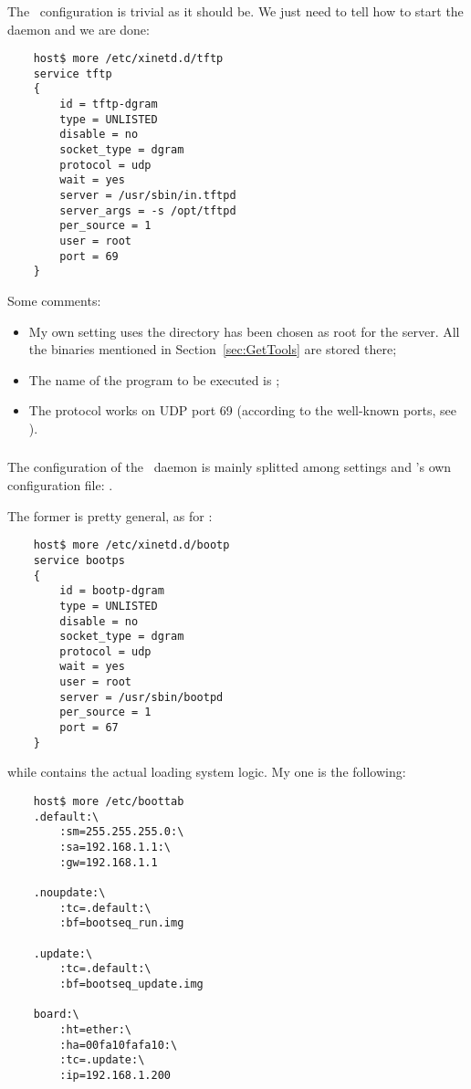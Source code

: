     \subsubsection{\TFTPd}

        The \TFTPd\ configuration is trivial as it should be. We just need
        to tell  how to start the daemon and we are
        done:

\begin{lstlisting}
    host$ more /etc/xinetd.d/tftp
    service tftp
    {
        id = tftp-dgram
        type = UNLISTED
        disable = no
        socket_type = dgram
        protocol = udp
        wait = yes
        server = /usr/sbin/in.tftpd
        server_args = -s /opt/tftpd
        per_source = 1
        user = root
        port = 69
    }
\end{lstlisting}

        Some comments:
        \begin{itemize}
        \item   My own setting uses the directory 
                has been chosen as root for the server. All the binaries
                mentioned in Section~\ref{sec:GetTools} are stored there;
        \item   The name of the program to be executed is
                ;
        \item   The protocol works on UDP port 69 (according to the
                well-known ports, see ).
        \end{itemize}

    \subsubsection{ \BootPd } \label{subsub:BootPd}

        The configuration of the \BootPd\ daemon is mainly splitted among
         settings and \BootPd's own configuration file:
        .

        The former is pretty general, as for \TFTPd:
\begin{lstlisting}
    host$ more /etc/xinetd.d/bootp
    service bootps
    {
        id = bootp-dgram
        type = UNLISTED
        disable = no
        socket_type = dgram
        protocol = udp
        wait = yes
        user = root
        server = /usr/sbin/bootpd
        per_source = 1
        port = 67
    }
\end{lstlisting}
        while  contains the actual loading system
        logic. My one is the following:
\begin{lstlisting}
    host$ more /etc/boottab
    .default:\
        :sm=255.255.255.0:\
        :sa=192.168.1.1:\
        :gw=192.168.1.1

    .noupdate:\
        :tc=.default:\
        :bf=bootseq_run.img

    .update:\
        :tc=.default:\
        :bf=bootseq_update.img

    board:\
        :ht=ether:\
        :ha=00fa10fafa10:\
        :tc=.update:\
        :ip=192.168.1.200
\end{lstlisting}

